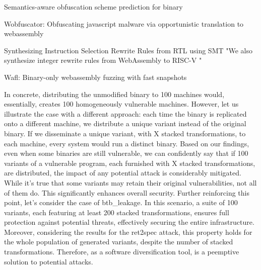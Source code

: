 Semantics-aware obfuscation scheme prediction for binary

Wobfuscator: Obfuscating javascript malware via opportunistic translation to webassembly

Synthesizing Instruction Selection Rewrite Rules from RTL using SMT
"We also synthesize integer rewrite rules from WebAssembly to RISC-V "

Wafl: Binary-only webassembly fuzzing with fast snapshots



In concrete, distributing the unmodified binary to 100 machines would, essentially, creates 100 homogeneously vulnerable machines.
However, let us illustrate the case with a different approach: each time the binary is replicated onto a different machine, we distribute a unique variant instead of the original binary. 
If we disseminate a unique variant, with X stacked transformations, to each machine, every system would run a distinct \wasm binary. 
Based on our findings, even when some binaries are still vulnerable, we can confidently say that if 100 variants of a vulnerable program, each furnished with X stacked transformations, are distributed, the impact of any potential attack is considerably mitigated.
While it's true that some variants may retain their original vulnerabilities, not all of them do. 
This significantly enhances overall security. 
Further reinforcing this point, let's consider the case of btb\_leakage. 
In this scenario, a suite of 100 variants, each featuring at least 200 stacked transformations, ensures full protection against potential threats, effectively securing the entire infrastructure.
Moreover, considering the results for the ret2spec attack, this property holds for the whole population of generated variants, despite the number of stacked transformations.
Therefore, \tool as a software diversification tool, is a peemptive solution to potential attacks.

